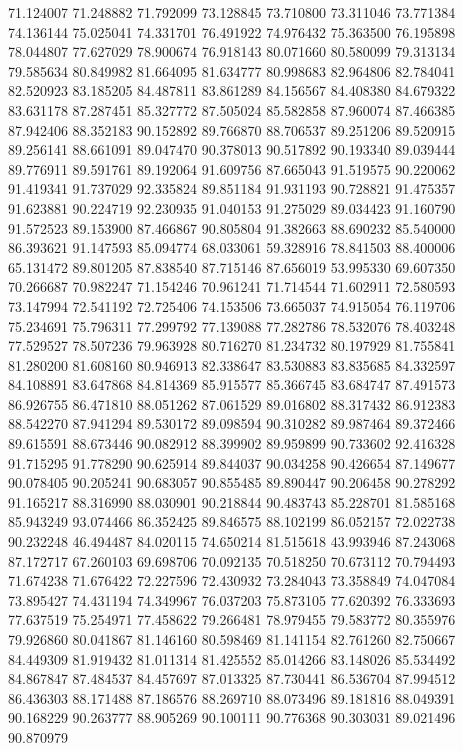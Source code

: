 71.124007
71.248882
71.792099
73.128845
73.710800
73.311046
73.771384
74.136144
75.025041
74.331701
76.491922
74.976432
75.363500
76.195898
78.044807
77.627029
78.900674
76.918143
80.071660
80.580099
79.313134
79.585634
80.849982
81.664095
81.634777
80.998683
82.964806
82.784041
82.520923
83.185205
84.487811
83.861289
84.156567
84.408380
84.679322
83.631178
87.287451
85.327772
87.505024
85.582858
87.960074
87.466385
87.942406
88.352183
90.152892
89.766870
88.706537
89.251206
89.520915
89.256141
88.661091
89.047470
90.378013
90.517892
90.193340
89.039444
89.776911
89.591761
89.192064
91.609756
87.665043
91.519575
90.220062
91.419341
91.737029
92.335824
89.851184
91.931193
90.728821
91.475357
91.623881
90.224719
92.230935
91.040153
91.275029
89.034423
91.160790
91.572523
89.153900
87.466867
90.805804
91.382663
88.690232
85.540000
86.393621
91.147593
85.094774
68.033061
59.328916
78.841503
88.400006
65.131472
89.801205
87.838540
87.715146
87.656019
53.995330
69.607350
70.266687
70.982247
71.154246
70.961241
71.714544
71.602911
72.580593
73.147994
72.541192
72.725406
74.153506
73.665037
74.915054
76.119706
75.234691
75.796311
77.299792
77.139088
77.282786
78.532076
78.403248
77.529527
78.507236
79.963928
80.716270
81.234732
80.197929
81.755841
81.280200
81.608160
80.946913
82.338647
83.530883
83.835685
84.332597
84.108891
83.647868
84.814369
85.915577
85.366745
83.684747
87.491573
86.926755
86.471810
88.051262
87.061529
89.016802
88.317432
86.912383
88.542270
87.941294
89.530172
89.098594
90.310282
89.987464
89.372466
89.615591
88.673446
90.082912
88.399902
89.959899
90.733602
92.416328
91.715295
91.778290
90.625914
89.844037
90.034258
90.426654
87.149677
90.078405
90.205241
90.683057
90.855485
89.890447
90.206458
90.278292
91.165217
88.316990
88.030901
90.218844
90.483743
85.228701
81.585168
85.943249
93.074466
86.352425
89.846575
88.102199
86.052157
72.022738
90.232248
46.494487
84.020115
74.650214
81.515618
43.993946
87.243068
87.172717
67.260103
69.698706
70.092135
70.518250
70.673112
70.794493
71.674238
71.676422
72.227596
72.430932
73.284043
73.358849
74.047084
73.895427
74.431194
74.349967
76.037203
75.873105
77.620392
76.333693
77.637519
75.254971
77.458622
79.266481
78.979455
79.583772
80.355976
79.926860
80.041867
81.146160
80.598469
81.141154
82.761260
82.750667
84.449309
81.919432
81.011314
81.425552
85.014266
83.148026
85.534492
84.867847
87.484537
84.457697
87.013325
87.730441
86.536704
87.994512
86.436303
88.171488
87.186576
88.269710
88.073496
89.181816
88.049391
90.168229
90.263777
88.905269
90.100111
90.776368
90.303031
89.021496
90.870979
